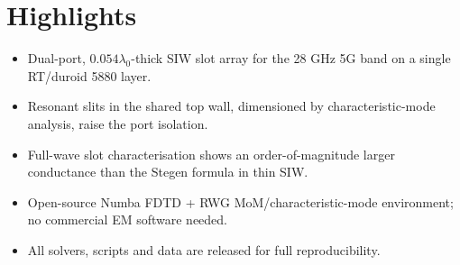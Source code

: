 \documentclass[12pt]{article}
\begin{document}
\section*{Highlights}
\begin{itemize}
\item Dual-port, $0.054\lambda_0$-thick SIW slot array for the 28 GHz 5G band on a single RT/duroid 5880 layer.
\item Resonant slits in the shared top wall, dimensioned by characteristic-mode analysis, raise the port isolation.
\item Full-wave slot characterisation shows an order-of-magnitude larger conductance than the Stegen formula in thin SIW.
\item Open-source Numba FDTD + RWG MoM/characteristic-mode environment; no commercial EM software needed.
\item All solvers, scripts and data are released for full reproducibility.
\end{itemize}
\end{document}

